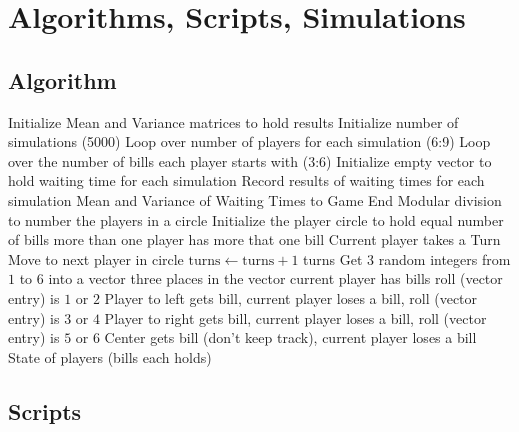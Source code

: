 \documentclass[12pt]{article}
\begin{document}
\hr

\section*{Algorithms, Scripts, Simulations}

\subsection*{Algorithm}

\begin{codebox}
     \li
    Initialize Mean and Variance matrices to hold results \li Initialize
    number of simulations (5000) \li Loop over number of players for
    each simulation (6:9) \li Loop over the number of bills each player
    starts with (3:6) \li Initialize empty vector to hold waiting time
    for each simulation \li Record results of waiting times for each
    simulation \li \Return Mean and Variance of Waiting Times to Game
    End  \li Modular division to number the
    players in a circle  \li Initialize the player circle
    to hold equal number of bills \li \While more than one player has
    more that one bill \li Current player takes a Turn \li Move to next
    player in circle \li \( \text{turns} \gets \text{turns} + 1 \) \li
    \End \li \Return turns  \li Get \( 3 \) random
    integers from \( 1 \) to \( 6 \) into a vector \li \For three places
    in the vector \li \If current player has bills \li \If roll (vector
    entry) is \( 1 \) or \( 2 \) \li Player to left gets bill, current
    player loses a bill, \li \If roll (vector entry) is \( 3 \) or \( 4 \)
    \li Player to right gets bill, current player loses a bill, \li \If
    roll (vector entry) is \( 5 \) or \( 6 \) \li Center gets bill (don't
    keep track), current player loses a bill \li \Return State of players (bills
    each holds)
\end{codebox}

\subsection*{Scripts}



\hr

\end{document}
